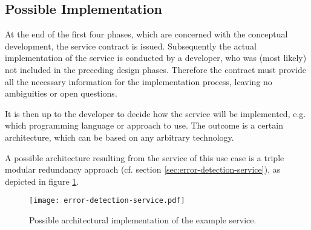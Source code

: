 \subsection{Possible Implementation}

At the end of the first four phases, which are concerned with the conceptual development, the service contract is issued. Subsequently the actual implementation of the service is conducted by a developer, who was (most likely) not included in the preceding design phases. Therefore the contract must provide all the necessary information for the implementation process, leaving no ambiguities or open questions.

It is then up to the developer to decide how the service will be implemented, e.g. which programming language or approach to use. The outcome is a certain architecture, which can be based on any arbitrary technology. 

A possible architecture resulting from the service of this use case is a triple modular redundancy approach (cf. section \ref{sec:error-detection-service}), as depicted in figure \ref{fig:example-service-architecture}. 


\begin{figure}[ht]
\centering
\texttt{[image: error-detection-service.pdf]}
\caption{Possible architectural implementation of the example service.}
\label{fig:example-service-architecture}
\end{figure}

